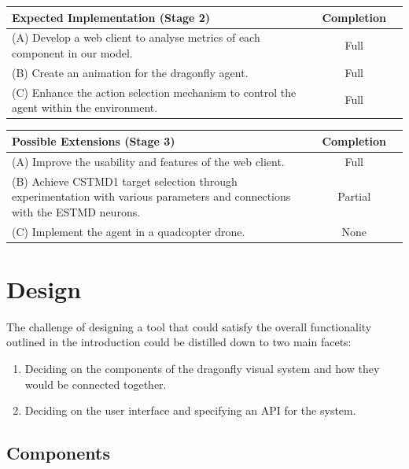 \documentclass[a4paper,11pt]{article}
\begin{document}
\begin{center}
    \begin{tabular}{p{12cm} c c}
    \textbf{Expected Implementation (Stage 2)} & \textbf{Completion} \\ \hline
	(A) Develop a web client to analyse metrics of each component in our model. & Full \\
	(B) Create an animation for the dragonfly agent. & Full\\
	(C) Enhance the action selection mechanism to control the agent within the environment. & Full\\
    \end{tabular}
\end{center}

\begin{center}
    \begin{tabular}{p{12cm} c c}
    \textbf{Possible Extensions (Stage 3)} & \textbf{Completion} \\ \hline
	(A) Improve the usability and features of the web client. & Full\\
	(B) Achieve CSTMD1 target selection through experimentation with various parameters and connections with the ESTMD neurons. & Partial\\
	(C) Implement the agent in a quadcopter drone. & None\\
    \end{tabular}
\end{center}







\clearpage
\section{Design}

The challenge of designing a tool that could satisfy the overall functionality outlined in the introduction could be distilled down to two main facets:
\begin{enumerate}
\item Deciding on the components of the dragonfly visual system and how they would be connected together.
\item Deciding on the user interface and specifying an API for the system.
\end{enumerate}

\subsection{Components}
\end{document}
